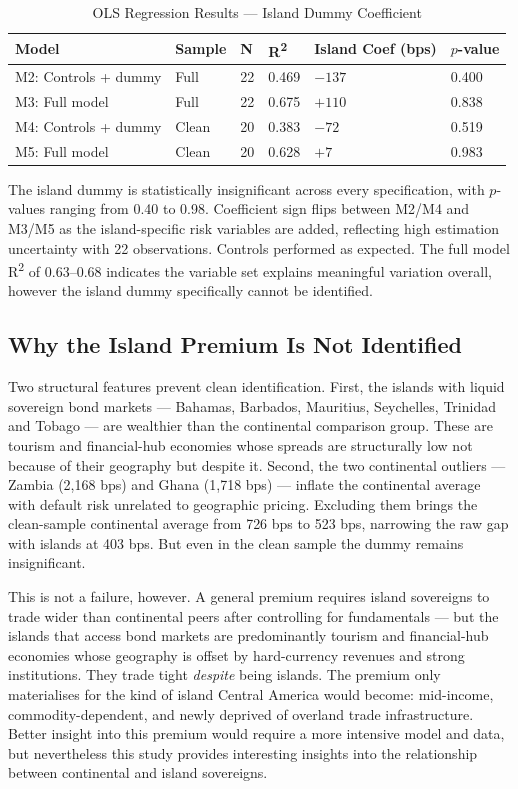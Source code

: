\documentclass[11pt, a4paper]{article}
\begin{document}
\begin{table}[H]
\centering
\caption{OLS Regression Results --- Island Dummy Coefficient}
\label{tab:regression}
\begin{tabular}{llC{1.1cm}C{1.1cm}C{2.2cm}C{1.6cm}}
\toprule
Model & Sample & N & R\textsuperscript{2} & Island Coef (bps) & $p$-value \\
\midrule
M2: Controls + dummy & Full                    & 22 & 0.469 & $-137$ & 0.400 \\
M3: Full model       & Full                    & 22 & 0.675 & $+110$ & 0.838 \\
M4: Controls + dummy & Clean & 20 & 0.383 & $-72$  & 0.519 \\
M5: Full model       & Clean                   & 20 & 0.628 & $+7$   & 0.983 \\
\end{tabular}
\end{table}

The island dummy is statistically insignificant across every specification, with $p$-values ranging from 0.40 to 0.98. Coefficient sign flips between M2/M4 and M3/M5 as the island-specific risk variables are added, reflecting high estimation uncertainty with 22 observations. Controls performed as expected. The full model R\textsuperscript{2} of 0.63--0.68 indicates the variable set explains meaningful variation overall, however the island dummy specifically cannot be identified.

\subsection{Why the Island Premium Is Not Identified}

Two structural features prevent clean identification. First, the islands with liquid sovereign bond markets --- Bahamas, Barbados, Mauritius, Seychelles, Trinidad and Tobago --- are wealthier than the continental comparison group. These are tourism and financial-hub economies whose spreads are structurally low not because of their geography but despite it. Second, the two continental outliers --- Zambia (2,168 bps) and Ghana (1,718 bps) --- inflate the continental average with default risk unrelated to geographic pricing. Excluding them brings the clean-sample continental average from 726 bps to 523 bps, narrowing the raw gap with islands at 403 bps. But even in the clean sample the dummy remains insignificant.

\medskip
\noindent This is not a failure, however. A general premium requires island sovereigns to trade wider than continental peers after controlling for fundamentals — but the islands that access bond markets are predominantly tourism and financial-hub economies whose geography is offset by hard-currency revenues and strong institutions. They trade tight \textit{despite} being islands. The premium only materialises for the kind of island Central America would become: mid-income, commodity-dependent, and newly deprived of overland trade infrastructure. Better insight into this premium would require a more intensive model and data, but nevertheless this study provides interesting insights into the relationship between continental and island sovereigns.
\end{document}
